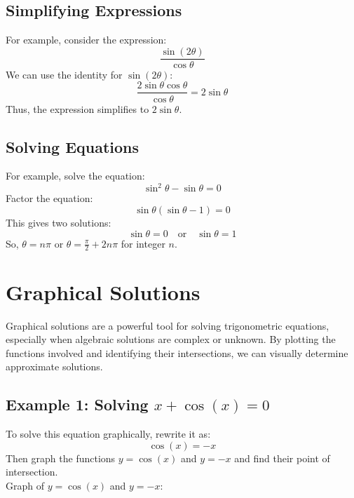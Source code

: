 \documentclass[12pt]{article}
\begin{document}
\newpage

\subsection*{Simplifying Expressions}
For example, consider the expression:
\[
\frac{\sin(2\theta)}{\cos \theta}
\]
We can use the identity for \(\sin(2\theta)\):
\[
\frac{2 \sin \theta \cos \theta}{\cos \theta} = 2 \sin \theta
\]
Thus, the expression simplifies to \(2 \sin \theta\).

\subsection*{Solving Equations}
For example, solve the equation:
\[
\sin^2 \theta - \sin \theta = 0
\]
Factor the equation:
\[
\sin \theta (\sin \theta - 1) = 0
\]
This gives two solutions:
\[
\sin \theta = 0 \quad \text{or} \quad \sin \theta = 1
\]
So, \(\theta = n\pi\) or \(\theta = \frac{\pi}{2} + 2n\pi\) for integer \(n\).

\newpage

\section*{Graphical Solutions}

Graphical solutions are a powerful tool for solving trigonometric equations, especially when algebraic solutions are complex or unknown. By plotting the functions involved and identifying their intersections, we can visually determine approximate solutions.

\subsection*{Example 1: Solving $x + \cos(x) = 0$}

To solve this equation graphically, rewrite it as:
\[
\cos(x) = -x
\]
Then graph the functions $y = \cos(x)$ and $y = -x$ and find their point of intersection.\\

Graph of $y = \cos(x)$ and $y = -x$:

\begin{center}
\end{center}
\end{document}
